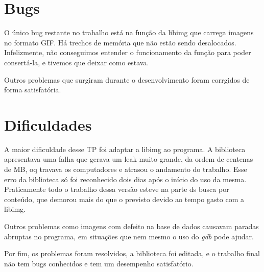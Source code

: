 \section{Bugs}
O único bug restante no trabalho está na função da libimg que carrega imagens no formato GIF. Há trechos de memória que não estão sendo desalocados. Infelizmente, não conseguimos entender o funcionamento da função para poder consertá-la, e tivemos que deixar como estava.

Outros problemas que surgiram durante o desenvolvimento foram corrgidos de forma satisfatória.

\section{Dificuldades}
A maior dificuldade desse TP foi adaptar a libimg ao programa. A biblioteca apresentava uma falha que gerava um leak muito grande, da ordem de centenas de MB, oq travava os computadores e atrasou o andamento do trabalho. Esse erro da biblioteca só foi reconhecido dois dias após o início do uso da mesma. Praticamente todo o trabalho dessa versão esteve na parte ds busca por conteúdo, que demorou mais do que o previsto devido ao tempo gasto com a libimg.

Outros problemas como imagens com defeito na base de dados causavam paradas abruptas no programa, em situações que nem mesmo o uso do \textit{gdb} pode ajudar.

Por fim, os problemas foram resolvidos, a biblioteca foi editada, e o trabalho final não tem bugs conhecidos e tem um desempenho satisfatório.

